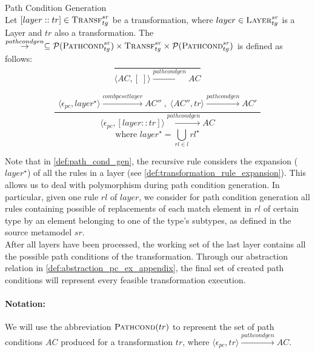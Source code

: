 \begin{definition} {Path Condition Generation\\}
\label{def:path_cond_gen}
Let $[layer::tr]\in \textsc{Transf}^{sr}_{tg}$ be a transformation, where $layer\in
\textsc{Layer}^{sr}_{tg}$ is a Layer and $tr$ also a transformation. The $\stackrel{pathcondgen}{\rightarrow}\subseteq \mathcal{P}(\textsc{Pathcond}^{sr}_{tg}) \times \textsc{Transf}^{sr}_{tg}\times
\mathcal{P}(\textsc{Pathcond}^{sr}_{tg})$ is defined as follows:
$$\frac{}
{\langle AC,[\;]\rangle \xrightarrow{pathcondgen} AC}$$

$$\frac{\begin{array}{ll}\langle \epsilon_{pc},layer^{\star}\rangle\xrightarrow{combpcsetlayer}AC''\;,\;\langle AC'',tr\rangle\xrightarrow{pathcondgen}AC'
\end{array}}
{\langle \epsilon_{pc},[layer::tr]\rangle \xrightarrow{pathcondgen} AC}$$
$$\text{where } layer^{\star}=\bigcup_{rl\in l}rl^{\star}$$

\end{definition}

Note that in \cref{def:path_cond_gen}, the recursive rule considers the expansion ($layer^{\star}$) of all the rules in a layer (see \cref{def:transformation_rule_expansion}). This allows us to deal with polymorphism during path condition generation. In particular, given one rule $rl$ of $layer$, we consider for path condition generation all rules containing possible of replacements of each match element in $rl$ of certain type by an element belonging to one of the type's subtypes, as defined in the source metamodel $sr$.\\
After all layers have been processed, the working set of the last layer contains all the possible path conditions of the transformation. Through our abstraction relation in \cref{def:abstraction_pc_ex_appendix}, the final set of created path conditions will represent every feasible transformation execution.

\paragraph{\textbf{Notation:}}

We will use the abbreviation $\textsc{Pathcond}(tr)$ to represent the set of path conditions $AC$ produced for a transformation $tr$, where $\langle \epsilon_{pc},tr\rangle \xrightarrow{pathcondgen} AC$.





